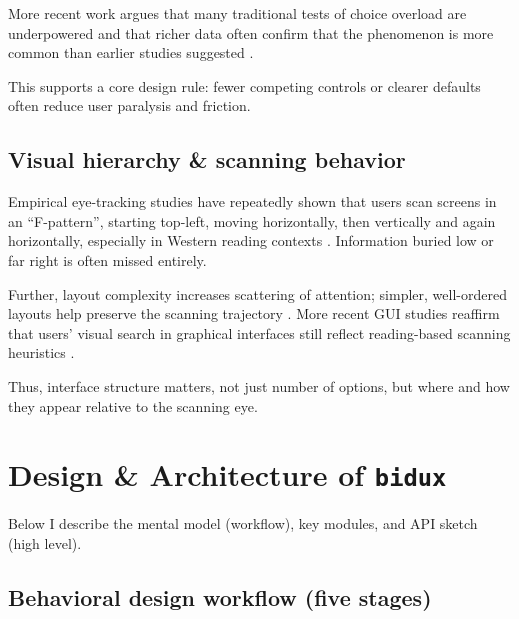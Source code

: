 \documentclass[
  authoryear,
  preprint]{elsarticle}
\begin{document}
More recent work argues that many traditional tests of choice overload
are underpowered and that richer data often confirm that the phenomenon
is more common than earlier studies suggested \citep{dean2022}.

This supports a core design rule: fewer competing controls or clearer
defaults often reduce user paralysis and friction.

\subsection{Visual hierarchy \& scanning
behavior}\label{visual-hierarchy-scanning-behavior}

Empirical eye-tracking studies have repeatedly shown that users scan
screens in an ``F-pattern'', starting top-left, moving horizontally,
then vertically and again horizontally, especially in Western reading
contexts \citep{djamasbi2011, nngroup2017}. Information buried low or
far right is often missed entirely.

Further, layout complexity increases scattering of attention; simpler,
well-ordered layouts help preserve the scanning trajectory
\citep{djamasbi2011}. More recent GUI studies reaffirm that users'
visual search in graphical interfaces still reflect reading-based
scanning heuristics \citep{putkonen2025}.

Thus, interface structure matters, not just number of options, but where
and how they appear relative to the scanning eye.

\section{\texorpdfstring{Design \& Architecture of
\texttt{bidux}}{Design \& Architecture of bidux}}\label{design-architecture-of-bidux}

Below I describe the mental model (workflow), key modules, and API
sketch (high level).

\subsection{Behavioral design workflow (five
stages)}\label{behavioral-design-workflow-five-stages}
\end{document}
